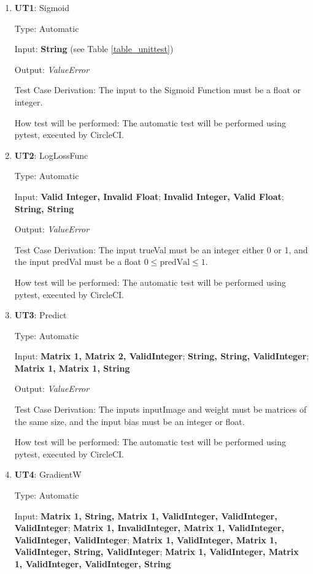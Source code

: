 \documentclass[12pt, titlepage]{article}
\begin{document}
\begin{enumerate}

\item{\textbf{UT1}: Sigmoid}

Type: Automatic
					
Input: \textbf{String} (see Table \ref{table_unittest})
					
Output: \textit{ValueError}

Test Case Derivation: The input to the Sigmoid Function must be a float or integer.

How test will be performed: The automatic test will be performed using pytest, executed by CircleCI.


\item{\textbf{UT2}: LogLossFunc}

Type: Automatic
					
Input: \textbf{Valid Integer, Invalid Float}; \textbf{Invalid Integer, Valid Float}; \textbf{String, String}
					
Output: \textit{ValueError}

Test Case Derivation: The input trueVal must be an integer either 0 or 1, and the input predVal must be a float $0 \leq \text{predVal} \leq 1$.

How test will be performed: The automatic test will be performed using pytest, executed by CircleCI.

\item{\textbf{UT3}: Predict}

Type: Automatic
					
Input: \textbf{Matrix 1, Matrix 2, ValidInteger}; \textbf{String, String, ValidInteger}; \textbf{Matrix 1, Matrix 1, String}
					
Output: \textit{ValueError}

Test Case Derivation: The inputs inputImage and weight must be matrices of the same size, and the input bias must be an integer or float.

How test will be performed: The automatic test will be performed using pytest, executed by CircleCI.

\item{\textbf{UT4}: GradientW}

Type: Automatic
					
Input: \textbf{Matrix 1, String, Matrix 1, ValidInteger, ValidInteger, ValidInteger}; \textbf{Matrix 1, InvalidInteger, Matrix 1, ValidInteger, ValidInteger, ValidInteger}; \textbf{Matrix 1, ValidInteger, Matrix 1, ValidInteger, String, ValidInteger}; \textbf{Matrix 1, ValidInteger, Matrix 1, ValidInteger, ValidInteger, String}
					

\end{enumerate}
\end{document}
